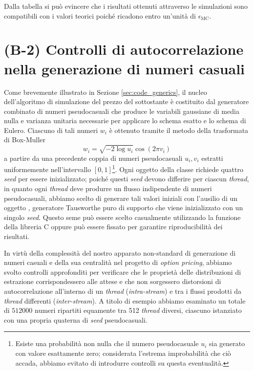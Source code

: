 Dalla tabella si può evincere che i risultati ottenuti attraverso le simulazioni sono compatibili con i valori teorici poiché ricadono entro un'unità di $\epsilon_\text{MC}$.

\section{(B-2) Controlli di autocorrelazione nella generazione di numeri casuali} \label{sec:correlation_check}

Come brevemente illustrato in Sezione \ref{sec:code_generics}, il nucleo dell'algoritmo di simulazione del prezzo del sottostante è costituito dal generatore combinato di numeri pseudocasuali che produce le variabili gaussiane di media nulla e varianza unitaria necessarie per applicare lo schema esatto e lo schema di Eulero. Ciascuno di tali numeri $w_i$ è ottenuto tramite il metodo della trasformata di Box-Muller
\begin{equation}
    w_i = \sqrt{-2 \log{u_i}} \cos{\left(2\pi v_i\right)}
    \label{eq:BoxMuller}
\end{equation}
a partire da una precedente coppia di numeri pseudocasuali $u_i, v_i$ estratti uniformemente nell'intervallo $[0,1]$\footnote{Esiste una probabilità non nulla che il numero pseudocasuale $u_i$ sia generato con valore esattamente zero; considerata l'estrema improbabilità che ciò accada, abbiamo evitato di introdurre controlli su questa eventualità.}. Ogni oggetto della classe  richiede quattro \textit{seed} per essere inizializzato; poiché questi \textit{seed} devono differire per ciascun \textit{thread}, in quanto ogni \textit{thread} deve produrre un flusso indipendente di numeri pseudocasuali, abbiamo scelto di generare tali valori iniziali con l'ausilio di un oggetto , generatore Tausworthe puro di supporto che viene inizializzato con un singolo \textit{seed}. Questo seme può essere scelto casualmente utilizzando la funzione  della libreria C  oppure può essere fissato per garantire riproducibilità dei risultati.

In virtù della complessità del nostro apparato non-standard di generazione di numeri casuali e della sua centralità nel progetto di \textit{option pricing}, abbiamo svolto controlli approfonditi per verificare che le proprietà delle distribuzioni di estrazione corrispondessero alle attese e che non sorgessero distorsioni di autocorrelazione all'interno di un \textit{thread} (\textit{intra-stream}) e tra i flussi prodotti da \textit{thread} differenti (\textit{inter-stream}). A titolo di esempio abbiamo esaminato un totale di $512000$ numeri ripartiti equamente tra 512 \textit{thread} diversi, ciascuno istanziato con una propria quaterna di \textit{seed} pseudocasuali.

